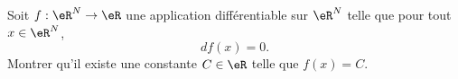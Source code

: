\begin{exercice}\label{exoCalculDifferentiel0016}

Soit $f : \eR ^N \to \eR$ une application différentiable sur $\eR ^N$ telle que pour tout $x\in\eR^N$,
\begin{equation}
df(x) = 0.
\end{equation}
Montrer qu'il existe une constante $C \in \eR$ telle que $f(x) = C$.

\end{exercice}
